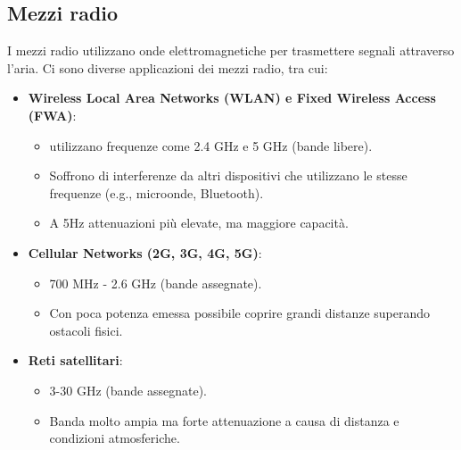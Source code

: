 \subsection{Mezzi radio}
I mezzi radio utilizzano onde elettromagnetiche per trasmettere segnali attraverso l'aria. 
Ci sono diverse applicazioni dei mezzi radio, tra cui:
\begin{itemize}
	\item \textbf{Wireless Local Area Networks (WLAN) e Fixed Wireless Access (FWA)}: 
	\begin{itemize}
		\item utilizzano frequenze come 2.4 GHz e 5 GHz (bande libere).
		\item Soffrono di interferenze da altri dispositivi che utilizzano le stesse frequenze (e.g., microonde, Bluetooth).
		\item A 5Hz attenuazioni più elevate, ma maggiore capacità.
	\end{itemize}
	\item \textbf{Cellular Networks (2G, 3G, 4G, 5G)}:
	\begin{itemize}
		\item 700 MHz - 2.6 GHz (bande assegnate).
		\item Con poca potenza emessa possibile coprire grandi distanze superando ostacoli fisici.
	\end{itemize}
	\item \textbf{Reti satellitari}:
	\begin{itemize}
		\item 3-30 GHz (bande assegnate).
		\item Banda molto ampia ma forte attenuazione a causa di distanza e condizioni atmosferiche.
	\end{itemize}
\end{itemize}
